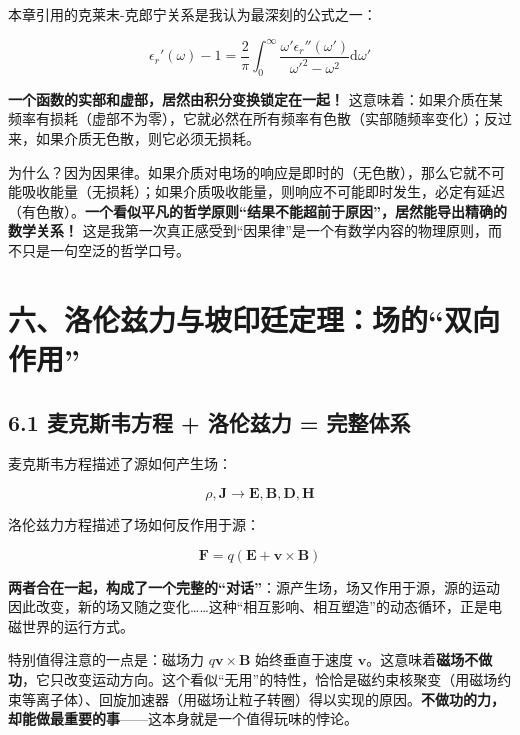 \documentclass[12pt,a4paper]{ctexart}
\begin{document}
本章引用的克莱末-克郎宁关系是我认为最深刻的公式之一：

\begin{equation}
\epsilon_r'(\omega) - 1 = \frac{2}{\pi} \int_0^\infty \frac{\omega' \epsilon_r''(\omega')}{\omega'^2 - \omega^2} \mathrm{d}\omega'
\end{equation}

\textbf{一个函数的实部和虚部，居然由积分变换锁定在一起！} 这意味着：如果介质在某频率有损耗（虚部不为零），它就必然在所有频率有色散（实部随频率变化）；反过来，如果介质无色散，则它必须无损耗。

为什么？因为因果律。如果介质对电场的响应是即时的（无色散），那么它就不可能吸收能量（无损耗）；如果介质吸收能量，则响应不可能即时发生，必定有延迟（有色散）。\textbf{一个看似平凡的哲学原则“结果不能超前于原因”，居然能导出精确的数学关系！} 这是我第一次真正感受到“因果律”是一个有数学内容的物理原则，而不只是一句空泛的哲学口号。

\section*{六、洛伦兹力与坡印廷定理：场的“双向作用”}

\subsection*{6.1 麦克斯韦方程 + 洛伦兹力 = 完整体系}

麦克斯韦方程描述了源如何产生场：

\begin{equation}
\rho, \mathbf{J} \longrightarrow \mathbf{E}, \mathbf{B}, \mathbf{D}, \mathbf{H}
\end{equation}

洛伦兹力方程描述了场如何反作用于源：

\begin{equation}
\mathbf{F} = q(\mathbf{E} + \mathbf{v} \times \mathbf{B})
\end{equation}

\textbf{两者合在一起，构成了一个完整的“对话”}：源产生场，场又作用于源，源的运动因此改变，新的场又随之变化……这种“相互影响、相互塑造”的动态循环，正是电磁世界的运行方式。

特别值得注意的一点是：磁场力 $q\mathbf{v} \times \mathbf{B}$ 始终垂直于速度 $\mathbf{v}$。这意味着\textbf{磁场不做功}，它只改变运动方向。这个看似“无用”的特性，恰恰是磁约束核聚变（用磁场约束等离子体）、回旋加速器（用磁场让粒子转圈）得以实现的原因。\textbf{不做功的力，却能做最重要的事}——这本身就是一个值得玩味的悖论。
\end{document}
